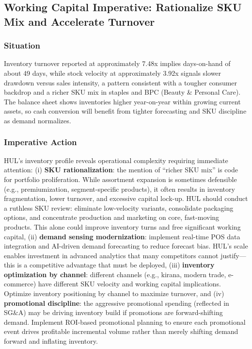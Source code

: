 \documentclass[12pt, a4paper]{report}
\begin{document}
\subsection{Working Capital Imperative: Rationalize SKU Mix and Accelerate Turnover}

\subsubsection{Situation}
Inventory turnover reported at approximately 7.48x implies days-on-hand of about 49 days, while stock velocity at approximately 3.92x signals slower drawdown versus sales intensity, a pattern consistent with a tougher consumer backdrop and a richer SKU mix in staples and BPC (Beauty \& Personal Care). The balance sheet shows inventories higher year-on-year within growing current assets, so cash conversion will benefit from tighter forecasting and SKU discipline as demand normalizes.

\subsubsection{Imperative Action}
HUL's inventory profile reveals operational complexity requiring immediate attention: (i) \textbf{SKU rationalization}: the mention of ``richer SKU mix'' is code for portfolio proliferation. While assortment expansion is sometimes defensible (e.g., premiumization, segment-specific products), it often results in inventory fragmentation, lower turnover, and excessive capital lock-up. HUL should conduct a ruthless SKU review: eliminate low-velocity variants, consolidate packaging options, and concentrate production and marketing on core, fast-moving products. This alone could improve inventory turns and free significant working capital, (ii) \textbf{demand sensing modernization}: implement real-time POS data integration and AI-driven demand forecasting to reduce forecast bias. HUL's scale enables investment in advanced analytics that many competitors cannot justify—this is a competitive advantage that must be deployed, (iii) \textbf{inventory optimization by channel}: different channels (e.g., kirana, modern trade, e-commerce) have different SKU velocity and working capital implications. Optimize inventory positioning by channel to maximize turnover, and (iv) \textbf{promotional discipline}: the aggressive promotional spending (reflected in SG\&A) may be driving inventory build if promotions are forward-shifting demand. Implement ROI-based promotional planning to ensure each promotional event drives profitable incremental volume rather than merely shifting demand forward and inflating inventory.
\end{document}

